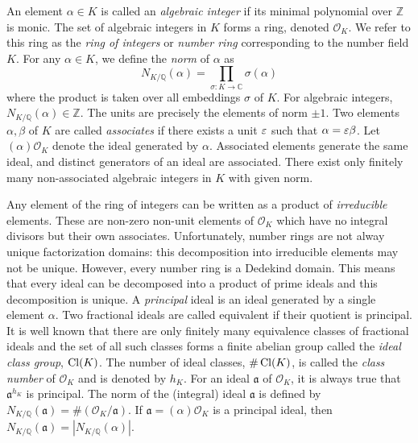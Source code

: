 An element $\alpha \in K$ is called an \textit{algebraic integer} if its minimal polynomial over $\mathbb{Z}$ is monic. The set of algebraic integers in $K$ forms a ring, denoted $\mathcal{O}_K$. We refer to this ring as the \textit{ring of integers} or \textit{number ring} corresponding to the number field $K$. For any $\alpha \in K$, we define the \textit{norm} of $\alpha$ as 
\[N_{K/\mathbb{Q}}(\alpha) = \prod_{\sigma:K \to \mathbb{C}} \sigma(\alpha)\]
where the product is taken over all embeddings $\sigma$ of $K$. For algebraic integers, $N_{K/\mathbb{Q}}(\alpha) \in \mathbb{Z}$. The units are precisely the elements of norm $\pm 1$. Two elements $\alpha, \beta$ of $K$ are called \textit{associates} if there exists a unit $\varepsilon$ such that $\alpha = \varepsilon \beta$. Let $(\alpha)\mathcal{O}_K$ denote the ideal generated by $\alpha$. Associated elements generate the same ideal, and distinct generators of an ideal are associated. There exist only finitely many non-associated algebraic integers in $K$ with given norm. 

Any element of the ring of integers can be written as a product of \textit{irreducible} elements. These are non-zero non-unit elements of $\mathcal{O}_K$ which have no integral divisors but their own associates. Unfortunately, number rings are not alway unique factorization domains: this decomposition into irreducible elements may not be unique. However, every number ring is a Dedekind domain. This means that every ideal can be decomposed into a product of prime ideals and this decomposition is unique. A \textit{principal} ideal is an ideal generated by a single element $\alpha$. Two fractional ideals are called equivalent if their quotient is principal. It is well known that there are only finitely many equivalence classes of fractional ideals and the set of all such classes forms a finite abelian group called the \textit{ideal class group}, $\operatorname{Cl}(K)$. The number of ideal classes, $\#\operatorname{Cl}(K)$, is called the \textit{class number} of $\mathcal{O}_K$ and is denoted by $h_K$. For an ideal $\mathfrak{a}$ of $\mathcal{O}_K$, it is always true that $\mathfrak{a}^{h_K}$ is principal. The norm of the (integral) ideal $\mathfrak{a}$ is defined by $N_{K/\mathbb{Q}}(\mathfrak{a}) = \#\left(\mathcal{O}_K/\mathfrak{a}\right)$. If $\mathfrak{a} = (\alpha) \mathcal{O}_K$ is a principal ideal, then $N_{K/\mathbb{Q}}(\mathfrak{a}) = \left|N_{K/\mathbb{Q}}(\alpha)\right|$. 

